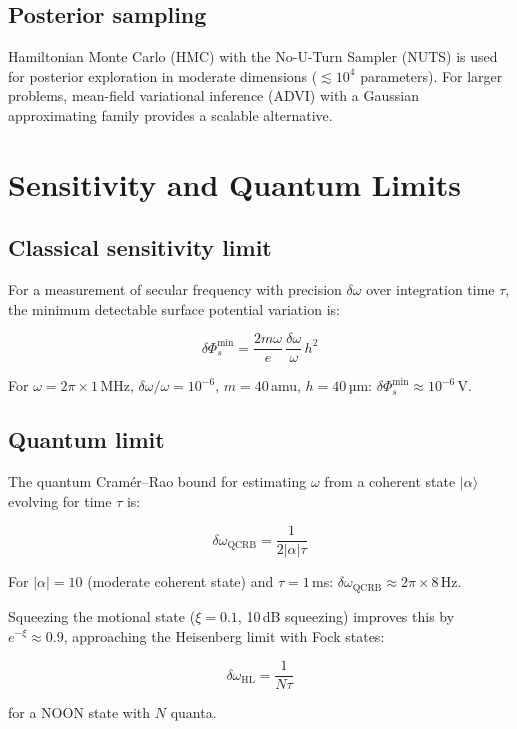 \documentclass[11pt,a4paper]{article}
\begin{document}
\subsection{Posterior sampling}

Hamiltonian Monte Carlo (HMC) with the No-U-Turn Sampler (NUTS) is used for
posterior exploration in moderate dimensions ($\lesssim 10^4$ parameters).
For larger problems, mean-field variational inference (ADVI) with a
Gaussian approximating family provides a scalable alternative.

\section{Sensitivity and Quantum Limits}

\subsection{Classical sensitivity limit}

For a measurement of secular frequency with precision $\delta\omega$ over
integration time $\tau$, the minimum detectable surface potential variation is:

\begin{equation}
\delta\Phi_s^{\text{min}} = \frac{2m\omega}{e}\,
    \frac{\delta\omega}{\omega}\,h^2
\label{eq:sensitivity_classical}
\end{equation}

For $\omega = 2\pi \times 1$ MHz, $\delta\omega/\omega = 10^{-6}$,
$m = 40$ amu, $h = 40$ µm:
$\delta\Phi_s^{\text{min}} \approx 10^{-6}$ V.

\subsection{Quantum limit}

The quantum Cramér–Rao bound for estimating $\omega$ from a coherent state
$|\alpha\rangle$ evolving for time $\tau$ is:

\begin{equation}
\delta\omega_{\text{QCRB}} = \frac{1}{2|\alpha|\tau}
\label{eq:qcrb}
\end{equation}

For $|\alpha| = 10$ (moderate coherent state) and $\tau = 1$ ms:
$\delta\omega_{\text{QCRB}} \approx 2\pi \times 8$ Hz.

Squeezing the motional state ($\xi = 0.1$, 10 dB squeezing) improves this by
$e^{-\xi} \approx 0.9$, approaching the Heisenberg limit with Fock states:

\begin{equation}
\delta\omega_{\text{HL}} = \frac{1}{N\tau}
\label{eq:heisenberg_limit}
\end{equation}

for a NOON state with $N$ quanta.
\end{document}
